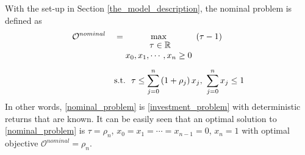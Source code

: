 \documentclass[10pt]{article}
\theoremstyle{definition}
\theoremstyle{plain}
\begin{document}
With the set-up in Section \ref{the_model_description}, the nominal problem is defined as
\begin{align}\label{nominal_problem}
\mathcal{O}^{nominal} \quad &= \max_{\begin{matrix}\
	\tau \in \mathbb{R} \\
	x_0, x_1, \cdots, x_n \geq 0
	\end{matrix}}\ \left(\tau - 1\right)\ \ \ \ \\[1ex] &\textnormal{s.t.}\ \ \tau \leq \sum_{j=0}^n \left(1+\rho_j\right) x_j,\  \sum_{j=0}^n x_j \leq 1
\end{align}
In other words, \eqref{nominal_problem} is \eqref{investment_problem} with deterministic returns that are known. It can be easily seen that an optimal solution to \ref{nominal_problem} is $\tau = \rho_n$, $x_0=x_1=\cdots=x_{n-1}=0$, $x_n=1$ with optimal objective $\mathcal{O}^{nominal} = \rho_n$. 


\newpage
{}

\end{document}
